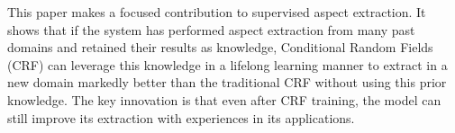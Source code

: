 This paper makes a focused contribution to supervised aspect extraction. It shows that if the system has performed aspect extraction from many past domains and retained their results as knowledge, Conditional Random Fields (CRF) can leverage this knowledge in a lifelong learning manner to extract in a new domain markedly better than the traditional CRF without using this prior knowledge. The key innovation is that even after CRF training, the model can still improve its extraction with experiences in its applications.
